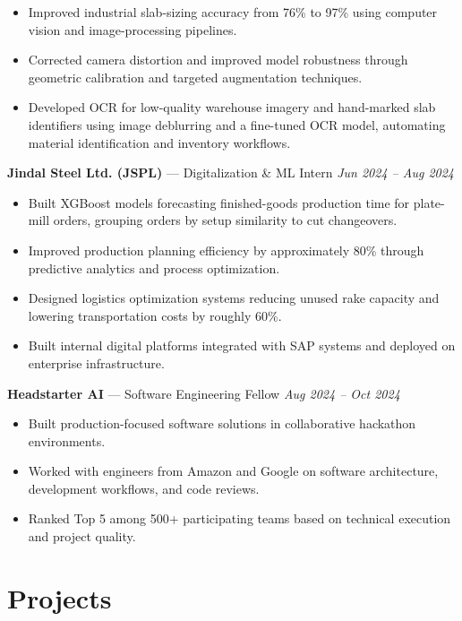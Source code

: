 \documentclass[a4paper,8pt]{extarticle}
\begin{document}
\begin{itemize}
\item Improved industrial slab-sizing accuracy from 76\% to 97\% using computer vision and image-processing pipelines.
\item Corrected camera distortion and improved model robustness through geometric calibration and targeted augmentation techniques.
\item Developed OCR for low-quality warehouse imagery and hand-marked slab identifiers using image deblurring and a fine-tuned OCR model, automating material identification and inventory workflows.
\end{itemize}

\noindent
\textbf{Jindal Steel Ltd. (JSPL)} --- Digitalization \& ML Intern
\hfill \textit{Jun 2024 -- Aug 2024}

\begin{itemize}
\item Built XGBoost models forecasting finished-goods production time for plate-mill orders, grouping orders by setup similarity to cut changeovers.
\item Improved production planning efficiency by approximately 80\% through predictive analytics and process optimization.
\item Designed logistics optimization systems reducing unused rake capacity and lowering transportation costs by roughly 60\%.
\item Built internal digital platforms integrated with SAP systems and deployed on enterprise infrastructure.
\end{itemize}

\noindent
\textbf{Headstarter AI} --- Software Engineering Fellow
\hfill \textit{Aug 2024 -- Oct 2024}

\begin{itemize}
\item Built production-focused software solutions in collaborative hackathon environments.
\item Worked with engineers from Amazon and Google on software architecture, development workflows, and code reviews.
\item Ranked Top 5 among 500+ participating teams based on technical execution and project quality.
\end{itemize}

\section*{Projects}
\end{document}
